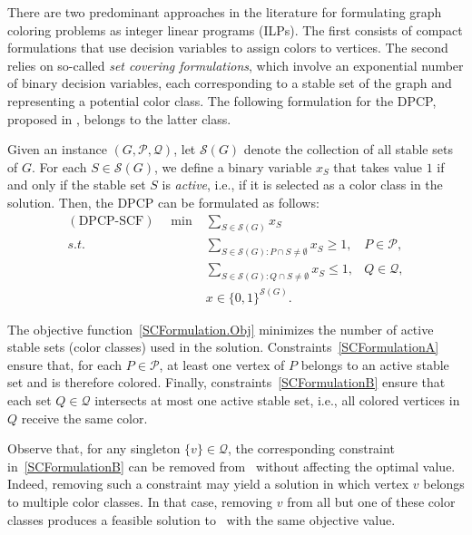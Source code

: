 \documentclass[preprint, 11pt, authoryear]{elsarticle}
\newcommand{\PP}{{\mathcal P}}
\newcommand{\QQ}{{\mathcal Q}}
\newcommand{\STAB}{{\mathscr S}}
\newcommand{\card}[1]{\left| #1 \right|}
\newcommand{\setcoveringform}{\text{DPCP-SCF}}
\begin{document}


There are two predominant approaches in the literature for formulating graph coloring problems as integer linear programs (ILPs). The first consists of compact formulations that use decision variables to assign colors to vertices. The second relies on so-called \emph{set covering formulations}, which involve an exponential number of binary decision variables, each corresponding to a stable set of the graph and representing a potential color class. The following formulation for the DPCP, proposed in \cite{LucciEtAl2025}, belongs to the latter class.

Given an instance $(G,\PP,\QQ)$, let $\STAB(G)$ denote the collection of all stable sets of $G$. For each $S \in \STAB(G)$, we define a binary variable $x_S$ that takes value $1$ if and only if the stable set $S$ is \emph{active}, i.e., if it is selected as a color class in the solution. Then, the DPCP can be formulated as follows:
\begin{align}
(\setcoveringform) \quad \min & \sum_{S \in \STAB(G)} x_S \label{SCFormulation.Obj}\\
s.t. & \sum_{S \in \STAB(G): P \cap S \neq \emptyset} x_S \geq 1, &  P \in \PP, \label{SCFormulationA} \\
    & \sum_{S \in \STAB(G): Q \cap S \neq \emptyset} x_S \leq 1, &  Q \in \QQ, 
    \label{SCFormulationB} \\
& x \in \{0,1\}^{\STAB(G)}. \nonumber
\end{align}

The objective function~\eqref{SCFormulation.Obj} minimizes the number of active stable sets (color classes) used in the solution. Constraints~\eqref{SCFormulationA} ensure that, for each $P \in \PP$, at least one vertex of $P$ belongs to an active stable set and is therefore colored. Finally, constraints~\eqref{SCFormulationB} ensure that each set $Q \in \QQ$ intersects at most one active stable set, i.e., all colored vertices in $Q$ receive the same color.

Observe that, for any singleton $\{v\} \in \QQ$, the corresponding constraint in~\eqref{SCFormulationB} can be removed from \setcoveringform\ without affecting the optimal value. Indeed, removing such a constraint may yield a solution in which vertex $v$ belongs to multiple color classes. In that case, removing $v$ from all but one of these color classes produces a feasible solution to \setcoveringform\ with the same objective value.
\end{document}
